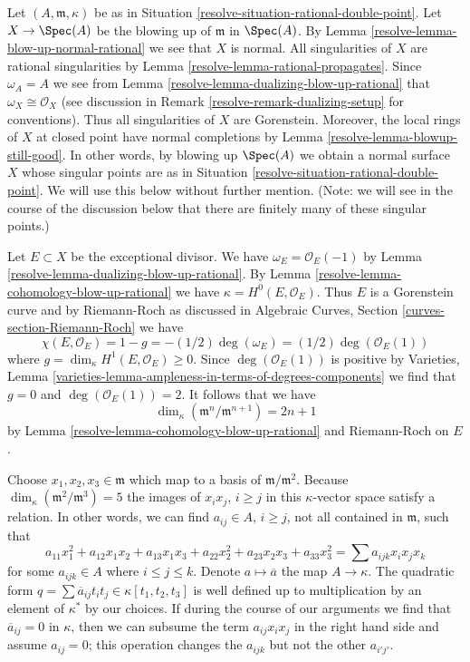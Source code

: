 Let $(A, \mathfrak m, \kappa)$ be as in
Situation \ref{resolve-situation-rational-double-point}.
Let $X \to \Spec(A)$ be the blowing up of $\mathfrak m$ in $\Spec(A)$.
By Lemma \ref{resolve-lemma-blow-up-normal-rational} we see that $X$ is normal.
All singularities of $X$ are rational singularities
by Lemma \ref{resolve-lemma-rational-propagates}.
Since $\omega_A = A$ we see from Lemma \ref{resolve-lemma-dualizing-blow-up-rational}
that $\omega_X \cong \mathcal{O}_X$ (see discussion in
Remark \ref{resolve-remark-dualizing-setup} for conventions).
Thus all singularities of $X$ are Gorenstein.
Moreover, the local rings of $X$ at closed point have
normal completions by Lemma \ref{resolve-lemma-blowup-still-good}.
In other words, by blowing up $\Spec(A)$ we obtain a normal
surface $X$ whose singular points are as in
Situation \ref{resolve-situation-rational-double-point}.
We will use this below without further mention.
(Note: we will see in the course of the discussion below
that there are finitely many of these singular points.)

\medskip\noindent
Let $E \subset X$ be the exceptional divisor. We have
$\omega_E = \mathcal{O}_E(-1)$ by Lemma \ref{resolve-lemma-dualizing-blow-up-rational}.
By Lemma \ref{resolve-lemma-cohomology-blow-up-rational} we have
$\kappa = H^0(E, \mathcal{O}_E)$.
Thus $E$ is a Gorenstein curve and by Riemann-Roch as discussed in
Algebraic Curves, Section \ref{curves-section-Riemann-Roch}
we have
$$
\chi(E, \mathcal{O}_E) = 1 - g = -(1/2) \deg(\omega_E) =
(1/2)\deg(\mathcal{O}_E(1))
$$
where $g = \dim_\kappa H^1(E, \mathcal{O}_E) \geq 0$.
Since $\deg(\mathcal{O}_E(1))$ is positive
by Varieties, Lemma
\ref{varieties-lemma-ampleness-in-terms-of-degrees-components}
we find that $g = 0$ and $\deg(\mathcal{O}_E(1)) = 2$. It follows that
we have
$$
\dim_\kappa (\mathfrak m^n/\mathfrak m^{n + 1}) = 2n + 1
$$
by Lemma \ref{resolve-lemma-cohomology-blow-up-rational} and Riemann-Roch
on $E$.

\medskip\noindent
Choose $x_1, x_2, x_3 \in \mathfrak m$ which map to a basis of
$\mathfrak m/\mathfrak m^2$. Because
$\dim_\kappa(\mathfrak m^2/\mathfrak m^3) = 5$
the images of $x_i x_j$, $i \geq j$ in this $\kappa$-vector space
satisfy a relation. In other words, we can find $a_{ij} \in A$,
$i \geq j$, not all contained in $\mathfrak m$, such that
$$
a_{11} x_1^2 + a_{12} x_1x_2 + a_{13}x_1x_3 + a_{22} x_2^2 +
a_{23} x_2x_3 + a_{33} x_3^2 =
\sum a_{ijk} x_ix_jx_k
$$
for some $a_{ijk} \in A$ where $i \leq j \leq k$. Denote
$a \mapsto \overline{a}$ the map $A \to \kappa$.
The quadratic form
$q = \sum \overline{a}_{ij} t_i t_j \in \kappa[t_1, t_2, t_3]$
is well defined up to multiplication by an element of $\kappa^*$
by our choices. If during the course of our arguments we find
that $\overline{a}_{ij} = 0$ in $\kappa$,
then we can subsume the term $a_{ij} x_i x_j$ in the right
hand side and assume $a_{ij} = 0$; this operation changes the $a_{ijk}$
but not the other $a_{i'j'}$.

